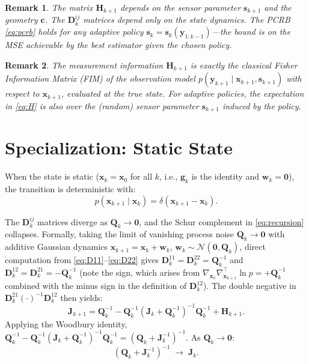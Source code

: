 \documentclass[11pt,a4paper]{article}
\newtheorem{remark}{Remark}
\begin{document}
\begin{remark}
The matrix $\bm{H}_{k+1}$ depends on the sensor parameter $\bm{s}_{k+1}$ and the geometry $\bm{c}$.  The $\bm{D}_k^{ij}$ matrices depend only on the state dynamics.  The PCRB \eqref{eq:pcrb} holds for \emph{any} adaptive policy $\bm{s}_k = \bm{s}_k(\bm{y}_{1:k-1})$---the bound is on the MSE achievable by the best estimator given the chosen policy.
\end{remark}

\begin{remark}
The measurement information $\bm{H}_{k+1}$ is exactly the classical Fisher Information Matrix (FIM) of the observation model $p(\bm{y}_{k+1} \mid \bm{x}_{k+1}, \bm{s}_{k+1})$ with respect to $\bm{x}_{k+1}$, evaluated at the true state.  For adaptive policies, the expectation in \eqref{eq:H} is also over the (random) sensor parameter $\bm{s}_{k+1}$ induced by the policy.
\end{remark}

\section{Specialization: Static State}

When the state is static ($\bm{x}_k = \bm{x}_0$ for all $k$, i.e., $\bm{g}_k$ is the identity and $\bm{w}_k = \bm{0}$), the transition is deterministic with:
\begin{equation}
  p(\bm{x}_{k+1} \mid \bm{x}_k) = \delta(\bm{x}_{k+1} - \bm{x}_k).
\end{equation}

The $\bm{D}_k^{ij}$ matrices diverge as $\bm{Q}_k \to \bm{0}$, and the Schur complement in \eqref{eq:recursion} collapses.  Formally, taking the limit of vanishing process noise $\bm{Q}_k \to \bm{0}$ with additive Gaussian dynamics $\bm{x}_{k+1} = \bm{x}_k + \bm{w}_k$, $\bm{w}_k \sim \mathcal{N}(\bm{0}, \bm{Q}_k)$, direct computation from \eqref{eq:D11}--\eqref{eq:D22} gives $\bm{D}_k^{11} = \bm{D}_k^{22} = \bm{Q}_k^{-1}$ and $\bm{D}_k^{12} = \bm{D}_k^{21} = -\bm{Q}_k^{-1}$ (note the sign, which arises from $\nabla_{\bm{x}_k}\nabla_{\bm{x}_{k+1}}^\top \ln p = +\bm{Q}_k^{-1}$ combined with the minus sign in the definition of $\bm{D}_k^{12}$).  The double negative in $\bm{D}_k^{21}(\cdot)^{-1}\bm{D}_k^{12}$ then yields:
\begin{equation}
  \bm{J}_{k+1} = \bm{Q}_k^{-1} - \bm{Q}_k^{-1}\left(\bm{J}_k + \bm{Q}_k^{-1}\right)^{-1}\bm{Q}_k^{-1} + \bm{H}_{k+1}.
\end{equation}
Applying the Woodbury identity, $\bm{Q}_k^{-1} - \bm{Q}_k^{-1}(\bm{J}_k + \bm{Q}_k^{-1})^{-1}\bm{Q}_k^{-1} = (\bm{Q}_k + \bm{J}_k^{-1})^{-1}$.  As $\bm{Q}_k \to \bm{0}$:
\begin{equation}
  (\bm{Q}_k + \bm{J}_k^{-1})^{-1} \;\to\; \bm{J}_k.
\end{equation}
\end{document}
